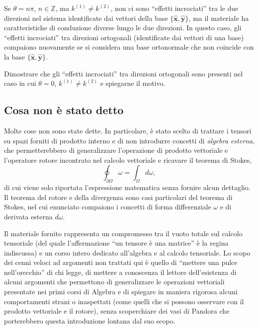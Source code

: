 Se $\theta = n \pi$, $n \in \mathbb{Z}$, ma $k^{(1)} \neq k^{(2)}$, non ci sono ``effetti incrociati'' tra le due direzioni nel sistema identificate dai vettori della base $\{ \bm{\hat{x}}, \bm{\hat{y}} \}$, ma il materiale ha caratteristiche di conduzione diverse lungo le due direzioni.
In questo caso, gli ``effetti incrociati'' tra direzioni ortogonali (identificate dai vettori di una base) compaiono nuovamente se si considera una base ortonormale che non coincide con la base $\{ \bm{\hat{x}}, \bm{\hat{y}} \}$.
\begin{exercise}
    Dimostrare che gli ``effetti incrociati'' tra direzioni ortogonali sono presenti nel caso in cui $\theta = 0$, $k^{(1)} \neq k^{(2)}$ e spiegarne il motivo.
\end{exercise}

\clearpage \newpage

\subsection{Cosa non è stato detto}
 Molte cose non sono state dette. In particolare, è stato scelto di trattare i tensori su spazi forniti di prodotto interno e di non introdurre concetti di \textit{algebra esterna}, che permetterebbero di generalizzare l'operazione di prodotto vettoriale e l'operatore rotore incontrato nel calcolo vettoriale e ricavare il teorema di Stokes,
\begin{equation}
 \oint_{\partial \Omega} \omega = \int_\Omega d\omega ,
\end{equation}
 di cui viene solo riportata l'espressione matematica senza fornire alcun dettaglio. Il teorema del rotore e della divergenza sono casi particolari del teorema di Stokes, nel cui enunciato compaiono i concetti di forma differenziale $\omega$ e di derivata esterna $d \omega$.

 \noindent
Il materiale fornito rappresenta un compromesso tra il vuoto totale sul calcolo tensoriale (del quale l'affermazione ``un tensore è una matrice'' è la regina indiscussa) e un corso intero dedicato all'algebra e al calcolo tensoriale. Lo scopo dei cenni veloci ad argomenti non trattati qui è quello di ``mettere una pulce nell'orecchio'' di chi legge, di mettere a conoscenza il lettore dell'esistenza di alcuni argomenti che permettono di generalizzare le operazioni vettoriali presentate nei primi corsi di Algebra e di spiegare in maniera rigorosa alcuni comportamenti strani o inaspettati (come quelli che si possono osservare con il prodotto vettoriale e il rotore), senza scoperchiare dei vasi di Pandora che porterebbero questa introduzione lontana dal suo scopo.

